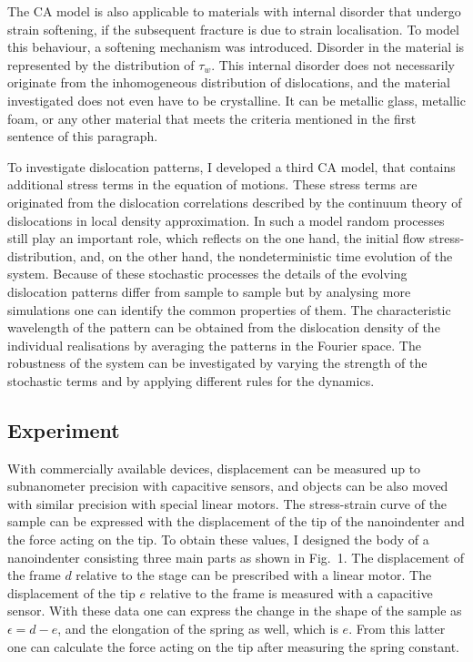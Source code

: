 \documentclass[a5paper,twoside,10pt]{article}
\begin{document}
The CA model is also applicable to materials with internal disorder that undergo strain softening, if the subsequent fracture is due to strain localisation. To model this behaviour, a softening mechanism was introduced. Disorder in the material is represented by the distribution of $\tau_w$. This internal disorder does not necessarily originate from the inhomogeneous distribution of dislocations, and the material investigated does not even have to be crystalline. It can be metallic glass, metallic foam, or any other material that meets the criteria mentioned in the first sentence of this paragraph.

To investigate dislocation patterns, I developed a third CA model, that contains additional stress terms in the equation of motions. These stress terms are originated from the dislocation correlations described by the continuum theory of dislocations in local density approximation. In such a model random processes still play an important role, which reflects on the one hand, the initial flow stress-distribution, and, on the other hand, the nondeterministic time evolution of the system. Because of these stochastic processes the details of the evolving dislocation patterns differ from sample to sample but by analysing more simulations one can identify the common properties of them. The characteristic wavelength of the pattern can be obtained from the dislocation density of the individual realisations by averaging the patterns in the Fourier space. The robustness of the system can be investigated by varying the strength of the stochastic terms and by applying different rules for the dynamics.

\subsection*{Experiment}
With commercially available devices, displacement can be measured up to subnanometer precision with capacitive sensors, and objects can be also moved with similar precision with special linear motors. The stress-strain curve of the sample can be expressed with the displacement of the tip of the nanoindenter and the force acting on the tip. To obtain these values, I designed the body of a nanoindenter consisting three main parts as shown in Fig.~1. The displacement of the frame $d$ relative to the stage can be prescribed with a linear motor. The displacement of the tip $e$ relative to the frame is measured with a capacitive sensor. With these data one can express the change in the shape of the sample as $\epsilon = d - e $, and the elongation of the spring as well, which is $e$. From this latter one can calculate the force acting on the tip after measuring the spring constant.
\end{document}
